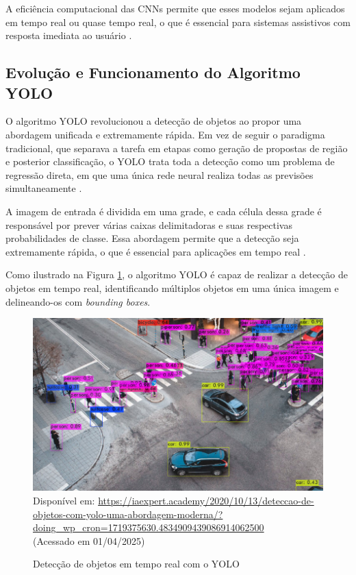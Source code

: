 A eficiência computacional das CNNs permite que esses modelos sejam aplicados em tempo real ou quase tempo real, o que é essencial para sistemas assistivos com resposta imediata ao usuário \cite{bochkovskiy2020}.

\subsection{\textbf{Evolução e Funcionamento do Algoritmo YOLO}}

O algoritmo YOLO revolucionou a detecção de objetos ao propor uma abordagem unificada e extremamente rápida. Em vez de seguir o paradigma tradicional, que separava a tarefa em etapas como geração de propostas de região e posterior classificação, o YOLO trata toda a detecção como um problema de regressão direta, em que uma única rede neural realiza todas as previsões simultaneamente \cite{redmon2016}.

A imagem de entrada é dividida em uma grade, e cada célula dessa grade é responsável por prever várias caixas delimitadoras e suas respectivas probabilidades de classe. Essa abordagem permite que a detecção seja extremamente rápida, o que é essencial para aplicações em tempo real \cite{bochkovskiy2020}.

Como ilustrado na Figura \ref{fg2}, o algoritmo YOLO é capaz de realizar a detecção de objetos em tempo real, identificando múltiplos objetos em uma única imagem e delineando-os com \textit{bounding boxes}.

\begin{figure}[htbp]
  \centering
  \caption{Detecção de objetos em tempo real com o YOLO}
  \includegraphics[width=1\textwidth]{Figuras/detec-yolo.png}
  \\
  Disponível em: \url{https://iaexpert.academy/2020/10/13/deteccao-de-objetos-com-yolo-uma-abordagem-moderna/?doing_wp_cron=1719375630.4834909439086914062500 } \\(Acessado em 01/04/2025)
  \label{fg2}
\end{figure}

